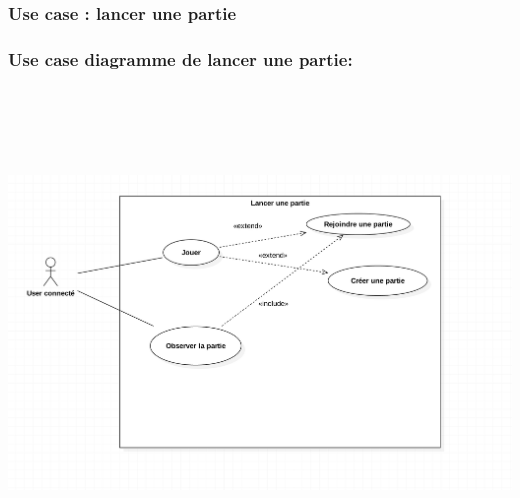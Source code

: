 \documentclass[10pt,a4paper]{article}
\begin{document}

\subsubsection{Use case : lancer une partie}
\subsubsection{Use case diagramme de lancer une partie:}	
\begin{center}
    \includegraphics[height=13cm,width=19cm]{lancer_une_partie.png}
\end{center}
\end{document}

